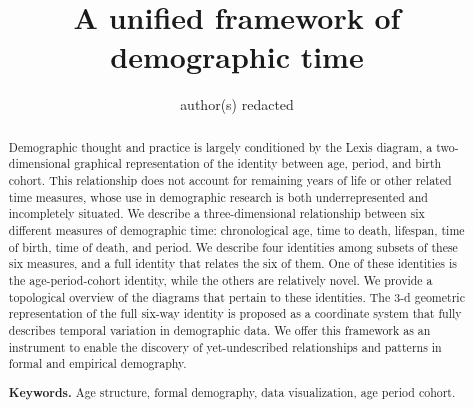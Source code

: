 \documentclass[12pt,oneside,a4paper]{article} %
\newcommand\ackn[1]{%
  \begingroup
  \renewcommand\thefootnote{}\footnote{#1}%
  \addtocounter{footnote}{-1}%
  \endgroup
}
\begin{document}
\title{A unified framework of demographic time}
\author{author(s) redacted}


\maketitle
\pagebreak
\begin{abstract}
Demographic thought and practice is largely conditioned by the Lexis diagram,
a two-dimensional graphical representation of the identity between age,
period, and birth cohort. This relationship does not account for remaining years
of life or other related time measures, whose use in
demographic research is both underrepresented and incompletely situated.
We describe a three-dimensional relationship between six different measures of demographic time: chronological age, time to death, lifespan, time of birth, time of death, and period. We describe four identities among subsets of these six measures, and a full identity that relates the six of them. One of these identities is the age-period-cohort identity, while the others are relatively novel. We
provide a topological overview of the diagrams that pertain to these identities.
The 3-d geometric representation of the full six-way identity is proposed as a
coordinate system that fully describes temporal variation in demographic data. We offer this framework as an
instrument to enable the discovery of yet-undescribed relationships and
patterns in formal and empirical demography.


\smallskip
\noindent \textbf{Keywords.} Age structure, formal demography, data
visualization, age period cohort.%
\end{abstract}

\end{document}
